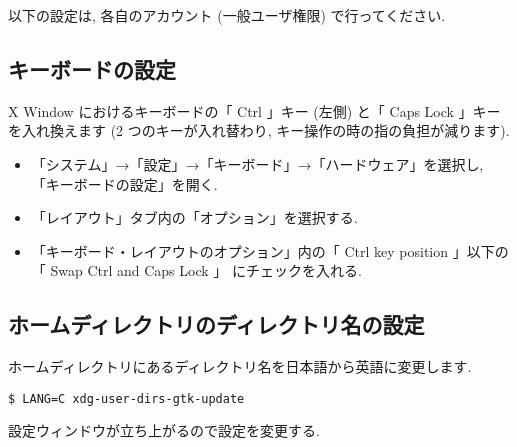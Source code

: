 \documentclass{jarticle}
\begin{document}
以下の設定は, 各自のアカウント (一般ユーザ権限) で行ってください.

%
%

\subsection{キーボードの設定}

X Window におけるキーボードの「 Ctrl 」キー (左側) と「 Caps Lock 」キーを入れ換えます
(2 つのキーが入れ替わり, キー操作の時の指の負担が減ります).
\begin{itemize}
	\item 「システム」→「設定」→「キーボード」→「ハードウェア」を選択し, 「キーボードの設定」を開く.
	\item 「レイアウト」タブ内の「オプション」を選択する.
	\item 「キーボード・レイアウトのオプション」内の「 Ctrl key position 」以下の「 Swap Ctrl and Caps Lock 」
	      にチェックを入れる.
\end{itemize}
\subsection{ホームディレクトリのディレクトリ名の設定}
ホームディレクトリにあるディレクトリ名を日本語から英語に変更します.
\begin{verbatim}
$ LANG=C xdg-user-dirs-gtk-update
\end{verbatim}
設定ウィンドウが立ち上がるので設定を変更する.
\end{document}
